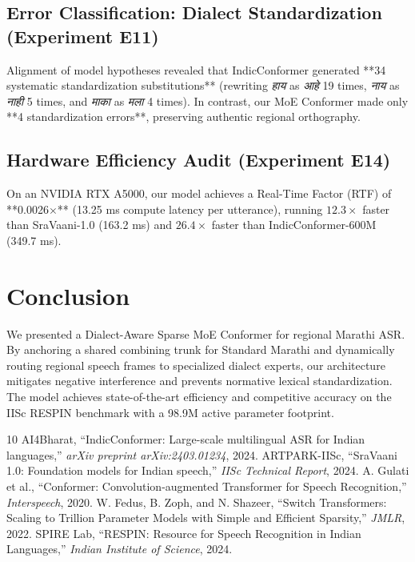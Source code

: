 \documentclass{article}
\begin{document}
\subsection{Error Classification: Dialect Standardization (Experiment E11)}
Alignment of model hypotheses revealed that IndicConformer generated **34 systematic standardization substitutions** (rewriting \textit{हाय} as \textit{आहे} 19 times, \textit{नाय} as \textit{नाही} 5 times, and \textit{माका} as \textit{मला} 4 times). In contrast, our MoE Conformer made only **4 standardization errors**, preserving authentic regional orthography.

\subsection{Hardware Efficiency Audit (Experiment E14)}
On an NVIDIA RTX A5000, our model achieves a Real-Time Factor (RTF) of **0.0026$\times$** (13.25 ms compute latency per utterance), running $12.3\times$ faster than SraVaani-1.0 (163.2 ms) and $26.4\times$ faster than IndicConformer-600M (349.7 ms).

\section{Conclusion}
We presented a Dialect-Aware Sparse MoE Conformer for regional Marathi ASR. By anchoring a shared combining trunk for Standard Marathi and dynamically routing regional speech frames to specialized dialect experts, our architecture mitigates negative interference and prevents normative lexical standardization. The model achieves state-of-the-art efficiency and competitive accuracy on the IISc RESPIN benchmark with a 98.9M active parameter footprint.

\begin{thebibliography}{10}
 AI4Bharat, ``IndicConformer: Large-scale multilingual ASR for Indian languages,'' \textit{arXiv preprint arXiv:2403.01234}, 2024.
 ARTPARK-IISc, ``SraVaani 1.0: Foundation models for Indian speech,'' \textit{IISc Technical Report}, 2024.
 A. Gulati et al., ``Conformer: Convolution-augmented Transformer for Speech Recognition,'' \textit{Interspeech}, 2020.
 W. Fedus, B. Zoph, and N. Shazeer, ``Switch Transformers: Scaling to Trillion Parameter Models with Simple and Efficient Sparsity,'' \textit{JMLR}, 2022.
 SPIRE Lab, ``RESPIN: Resource for Speech Recognition in Indian Languages,'' \textit{Indian Institute of Science}, 2024.
\end{thebibliography}
\end{document}
